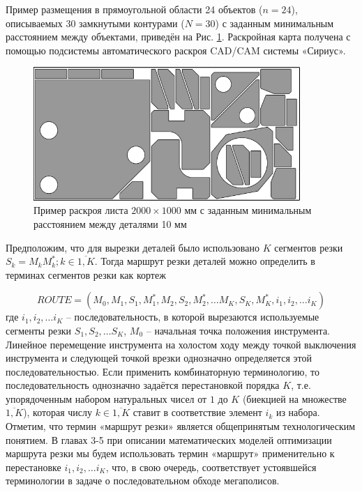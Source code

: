 \documentclass[12pt,twoside]{report}
\begin{document}
Пример размещения в прямоугольной области 24 объектов
($n=24$),
описываемых 30 замкнутыми контурами
($N=30$)
с заданным минимальным расстоянием между объектами,
приведён на Рис. \ref{nesting}.
Раскройная карта получена с
помощью подсистемы автоматического раскроя CAD/CAM системы «Сириус».

\begin{figure}
  \begin{center}
  \includegraphics[width=0.9\textwidth]{nesting.png}
  \caption{Пример раскроя листа $2000 \times 1000$ мм с заданным минимальным расстоянием между деталями 10 мм}
  \label{nesting}
  \end{center}
\end{figure}

Предположим, что для вырезки деталей было использовано
$K$
сегментов резки
$S_k=M_kM^*_k; k \in \overline{1,K}$.
Тогда маршрут резки деталей можно определить
в терминах сегментов резки как кортеж

\begin{equation}
  ROUTE = (
    M_0, M_1, S_1, M_1^*, M_2, S_2, M_2^*, \dots M_K, S_K, M_K^*, i_1, i_2, \dots i_K
  )
  \label{tuple}
\end{equation}
где
$i_1, i_2, \dots i_K$
– последовательность, в которой вырезаются используемые сегменты резки
$S_1, S_2, \dots S_K$,
$M_0$
– начальная точка положения инструмента.
Линейное перемещение инструмента на холостом ходу
между точкой выключения инструмента и следующей точкой врезки
однозначно определяется этой последовательностью.
Если применить комбинаторную терминологию,
то последовательность однозначно задаётся перестановкой порядка
$K$,
т.е. упорядоченным набором натуральных чисел от $1$ до $K$
(биекцией на множестве $\overline{1,K}$),
которая числу
$k \in \overline{1,K}$
ставит в соответствие элемент
$i_k$ из набора.
Отметим, что термин «маршрут резки» является
общепринятым технологическим понятием.
В главах 3-5 при описании математических моделей оптимизации
маршрута резки мы будем использовать термин «маршрут»
применительно к перестановке
$i_1, i_2, \dots i_K$,
что, в свою очередь, соответствует устоявшейся
терминологии в задаче о последовательном обходе мегаполисов.
\end{document}
